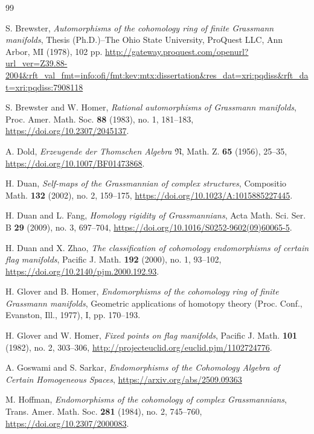 \documentclass{amsart}
\begin{document}
\begin{thebibliography}{99}

 S. Brewster, \textit{Automorphisms of the cohomology ring of finite Grassmann manifolds}, Thesis (Ph.D.)--The Ohio State University, ProQuest LLC, Ann Arbor, MI (1978), 102 pp. \url{http://gateway.proquest.com/openurl?url_ver=Z39.88-2004&rft_val_fmt=info:ofi/fmt:kev:mtx:dissertation&res_dat=xri:pqdiss&rft_dat=xri:pqdiss:7908118}
	
 S. Brewster and W. Homer, \textit{Rational automorphisms of Grassmann manifolds}, Proc. Amer. Math. Soc. \textbf{88} (1983), no. 1, 181--183, \url{https://doi.org/10.2307/2045137}.
	
 A. Dold, \textit{Erzeugende der Thomschen Algebra }$\mathfrak{N}$, Math. Z. \textbf{65} (1956), 25--35, \url{https://doi.org/10.1007/BF01473868}.

 H. Duan, \textit{Self-maps of the Grassmannian of complex structures}, Compositio Math. \textbf{132} (2002), no. 2, 159--175, \url{https://doi.org/10.1023/A:1015885227445}.
	
 H. Duan and L. Fang, \textit{Homology rigidity of Grassmannians}, Acta Math. Sci. Ser. B \textbf{29} (2009), no. 3, 697--704, \url{https://doi.org/10.1016/S0252-9602(09)60065-5}.

 H. Duan and X. Zhao, \textit{The classification of cohomology endomorphisms of certain flag manifolds}, Pacific J. Math. \textbf{192} (2000), no. 1, 93--102, \url{https://doi.org/10.2140/pjm.2000.192.93}.
	
 H. Glover and B. Homer, \textit{Endomorphisms of the cohomology ring of finite Grassmann manifolds}, Geometric applications of homotopy theory (Proc. Conf., Evanston, Ill., 1977), I, pp. 170--193.
	
 H. Glover and W. Homer, \textit{Fixed points on flag manifolds}, Pacific J. Math. \textbf{101} (1982), no. 2, 303--306, \url{http://projecteuclid.org/euclid.pjm/1102724776}.
	
 A. Goswami and S. Sarkar, \textit{Endomorphisms of the Cohomology Algebra of Certain Homogeneous Spaces}, \url{https://arxiv.org/abs/2509.09363}

 M. Hoffman, \textit{Endomorphisms of the cohomology of complex Grassmannians}, Trans. Amer. Math. Soc. \textbf{281} (1984), no. 2, 745--760, \url{https://doi.org/10.2307/2000083}.


\end{thebibliography}
\end{document}
